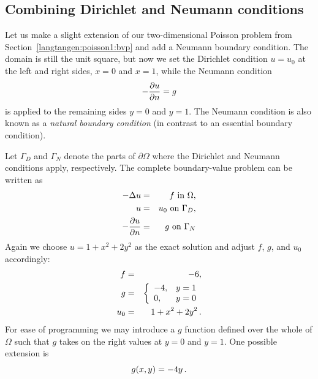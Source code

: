\subsection{Combining Dirichlet and Neumann conditions}
\label{langtangen:poisson1:DN}

Let us make a slight extension of our two-dimensional Poisson problem
from Section~\ref{langtangen:poisson1:bvp}
and add a Neumann boundary condition. The domain is still
the unit square, but now we set the Dirichlet condition
$u=u_0$ at the left and right sides,
$x=0$ and $x=1$, while the Neumann condition
\[ -{\partial u\over\partial n}=g \]
is applied to the remaining
sides $y=0$ and $y=1$. 
The Neumann condition is also known as a \emph{natural boundary condition}
(in contrast to an essential boundary condition).

Let $\Gamma_D$ and $\Gamma_N$
denote the parts of $\partial\Omega$ where the Dirichlet and Neumann
conditions apply, respectively.
The complete boundary-value problem can be written as
\begin{eqnarray} 
    - \Delta u &=& f \mbox{ in } \Omega,  \\ %
    u &=& u_0 \mbox{ on } \Gamma_D,       \\ %
    - {\partial u\over\partial n} &=& g \mbox{ on } \Gamma_N  %
\end{eqnarray}
Again we choose $u=1+x^2 + 2y^2$ as the exact solution and adjust $f$, $g$, and
$u_0$ accordingly:
\begin{eqnarray*}
f &=& -6,\\
g &=& \left\lbrace\begin{array}{ll}
-4, & y=1\\
0,  & y=0
\end{array}\right.\\
u_0 &=& 1 + x^2 + 2y^2\thinspace .
\end{eqnarray*}
For ease of programming we may introduce a $g$ function defined over the whole
of $\Omega$ such that $g$ takes on the right values at $y=0$ and
$y=1$. One possible extension is
\[ g(x,y) = -4y\thinspace .\]

